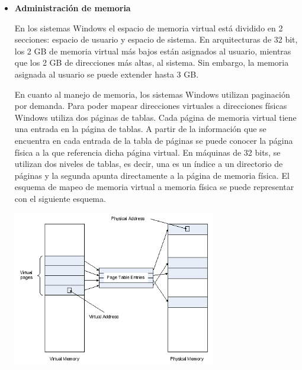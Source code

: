 \documentclass[a4paper,11pt] {article}
\begin{document}
\begin{itemize}
\begin{itemize}
		\item \textbf{Administración de memoria}

		En los sistemas Windows el espacio de memoria virtual está dividido en 2 secciones: espacio de usuario y espacio de sistema. En arquitecturas de 32 bit, los 2 GB de memoria virtual más bajos están asignados al usuario, mientras que los 2 GB de direcciones más altas, al sistema. Sin embargo, la memoria asignada al usuario se puede extender hasta 3 GB.
		
		En cuanto al manejo de memoria, los sistemas Windows utilizan paginación por demanda. Para poder mapear direcciones virtuales a direcciones físicas Windows utiliza dos páginas de tablas. Cada página de memoria virtual tiene una entrada en la página de tablas. A partir de la información que se encuentra en cada entrada de la tabla de páginas se puede conocer la página física a la que referencia dicha página virtual. En máquinas de 32 bits, se utilizan dos niveles de tablas, es decir, una es un índice a un directorio de páginas y la segunda apunta directamente a la página de memoria física. El esquema de mapeo de memoria virtual a memoria física se puede representar con el siguiente esquema.

		\begin{center}
		\includegraphics[width=0.7\textwidth]{virtual.png}
		\end{center}
	\end{itemize}

\end{itemize}
\end{document}
